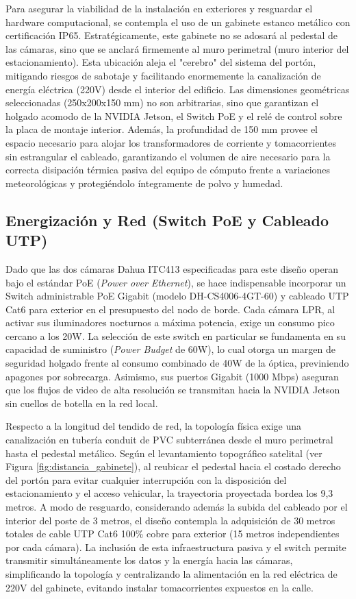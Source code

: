 Para asegurar la viabilidad de la instalación en exteriores y resguardar el hardware computacional, se contempla el uso de un gabinete estanco metálico con certificación IP65. Estratégicamente, este gabinete no se adosará al pedestal de las cámaras, sino que se anclará firmemente al muro perimetral (muro interior del estacionamiento). Esta ubicación aleja el "cerebro" del sistema del portón, mitigando riesgos de sabotaje y facilitando enormemente la canalización de energía eléctrica (220V) desde el interior del edificio. Las dimensiones geométricas seleccionadas (250x200x150 mm) no son arbitrarias, sino que garantizan el holgado acomodo de la NVIDIA Jetson, el Switch PoE y el relé de control sobre la placa de montaje interior. Además, la profundidad de 150 mm provee el espacio necesario para alojar los transformadores de corriente y tomacorrientes sin estrangular el cableado, garantizando el volumen de aire necesario para la correcta disipación térmica pasiva del equipo de cómputo frente a variaciones meteorológicas y protegiéndolo íntegramente de polvo y humedad.

\subsection{Energización y Red (Switch PoE y Cableado UTP)}

Dado que las dos cámaras Dahua ITC413 especificadas para este diseño operan bajo el estándar PoE (\textit{Power over Ethernet}), se hace indispensable incorporar un Switch administrable PoE Gigabit (modelo DH-CS4006-4GT-60) y cableado UTP Cat6 para exterior en el presupuesto del nodo de borde. Cada cámara LPR, al activar sus iluminadores nocturnos a máxima potencia, exige un consumo pico cercano a los 20W. La selección de este switch en particular se fundamenta en su capacidad de suministro (\textit{Power Budget} de 60W), lo cual otorga un margen de seguridad holgado frente al consumo combinado de 40W de la óptica, previniendo apagones por sobrecarga. Asimismo, sus puertos Gigabit (1000 Mbps) aseguran que los flujos de video de alta resolución se transmitan hacia la NVIDIA Jetson sin cuellos de botella en la red local.

Respecto a la longitud del tendido de red, la topología física exige una canalización en tubería conduit de PVC subterránea desde el muro perimetral hasta el pedestal metálico. Según el levantamiento topográfico satelital (ver Figura \ref{fig:distancia_gabinete}), al reubicar el pedestal hacia el costado derecho del portón para evitar cualquier interrupción con la disposición del estacionamiento y el acceso vehicular, la trayectoria proyectada bordea los 9,3 metros. A modo de resguardo, considerando además la subida del cableado por el interior del poste de 3 metros, el diseño contempla la adquisición de 30 metros totales de cable UTP Cat6 100\% cobre para exterior (15 metros independientes por cada cámara). La inclusión de esta infraestructura pasiva y el switch permite transmitir simultáneamente los datos y la energía hacia las cámaras, simplificando la topología y centralizando la alimentación en la red eléctrica de 220V del gabinete, evitando instalar tomacorrientes expuestos en la calle.

